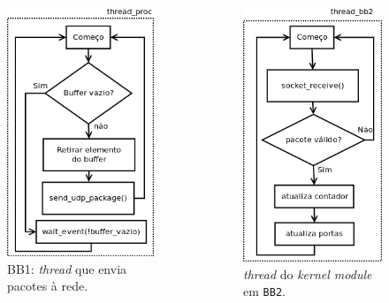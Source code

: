 \documentclass{beamer}
\begin{document}
\begin{frame}
\begin{columns}
\begin{column}{.33\textwidth}
\begin{figure}[h!]
		  \centering
		  \includegraphics[scale=0.260]{image/thread_proc}
		  \caption{\centering BB1: \textit{thread} que envia pacotes à
		  rede.}
		  \label{fig:thread_proc} 
\end{figure}
\end{column}

\begin{column}{.33\textwidth}

\begin{figure}[h!]
			\centering
			\includegraphics[scale=0.260]{image/thread_bb2}
			\caption {\centering \textit{thread} do \textit{kernel module}
			em
			\texttt{BB2}.}
			\label{fig:thread_bb2}
\end{figure}
\end{column}

\end{columns}
\end{frame}
\end{document}
